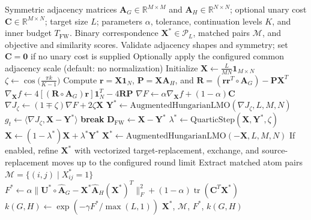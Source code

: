 \documentclass[conference]{IEEEtran}
\begin{document}
\begin{algorithm}[t]
\caption{Fast-WCS Analytical Homotopy and Frank-Wolfe Optimization (Phase 1)}
\label{alg:fast_wcs}
\begin{algorithmic}[1]\small
\REQUIRE Symmetric adjacency matrices $\mathbf{A}_G \in \mathbb{R}^{M \times M}$ and $\mathbf{A}_H \in \mathbb{R}^{N \times N}$; optional unary cost $\mathbf{C} \in \mathbb{R}^{M \times N}$; target size $L$; parameters $\alpha$, tolerance, continuation levels $K$, and inner budget $T_{\text{FW}}$.
\ENSURE Binary correspondence $\mathbf{X}^* \in \mathcal{P}_L$, matched pairs $\mathcal{M}$, and objective and similarity scores.
\STATE Validate adjacency shapes and symmetry; set $\mathbf{C}=\mathbf{0}$ if no unary cost is supplied
\STATE Optionally apply the configured common adjacency scale (default: no normalization)
\STATE Initialize $\mathbf{X} \leftarrow \frac{L}{MN}\mathbf{1}_{M \times N}$
    \STATE $\zeta \leftarrow \cos\big(\frac{\pi k}{K - 1}\big)$ 
        \STATE Compute $\mathbf{r}=\mathbf{X}\mathbf{1}_N$, $\mathbf{P}=\mathbf{X}\mathbf{A}_H$, and $\mathbf{R}=(\mathbf{r}\mathbf{r}^T\circ\mathbf{A}_G)-\mathbf{P}\mathbf{X}^T$
        \STATE $\nabla_{\mathbf{X}} f \leftarrow 4[(\mathbf{R}\circ\mathbf{A}_G)\mathbf{r}]\mathbf{1}_N^T - 4\mathbf{R}\mathbf{P}$ 
        \STATE $\nabla F \leftarrow \alpha \nabla_{\mathbf{X}} f + (1 - \alpha)\mathbf{C}$
        \STATE $\nabla J_\zeta \leftarrow (1 \mp \zeta)\nabla F + 2\zeta \mathbf{X}$ 
        \STATE $\mathbf{Y}^* \leftarrow \text{AugmentedHungarianLMO}(\nabla J_\zeta, L, M, N)$
        \STATE $g_t \leftarrow \langle \nabla J_\zeta, \mathbf{X} - \mathbf{Y}^* \rangle$
            \STATE \textbf{break} 
        \ENDIF
        \STATE $\mathbf{D}_{\text{FW}} \leftarrow \mathbf{X} - \mathbf{Y}^*$ 
        \STATE $\lambda^* \leftarrow \text{QuarticStep}(\mathbf{X}, \mathbf{Y}^*, \zeta)$ 
        \STATE $\mathbf{X} \leftarrow (1 - \lambda^*)\mathbf{X} + \lambda^* \mathbf{Y}^*$ 
    \ENDFOR
\ENDFOR
\STATE $\mathbf{X}^* \leftarrow \text{AugmentedHungarianLMO}(-\mathbf{X}, L, M, N)$
\STATE If enabled, refine $\mathbf{X}^*$ with vectorized target-replacement, exchange, and source-replacement moves up to the configured round limit
\STATE Extract matched atom pairs $\mathcal{M} = \{(i, j) \mid X^*_{ij} = 1\}$
\STATE $F^* \leftarrow \alpha \|\mathbf{U}^* \circ \hat{\mathbf{A}}_G - \mathbf{X}^*\hat{\mathbf{A}}_H(\mathbf{X}^*)^T\|_F^2 + (1 - \alpha)\operatorname{tr}(\mathbf{C}^T\mathbf{X}^*)$
\STATE $k(G,H) \leftarrow \exp(-\gamma F^* / \max(L,1))$
\RETURN $\mathbf{X}^*$, $\mathcal{M}$, $F^*$, $k(G,H)$
\end{algorithmic}
\end{algorithm}
\end{document}
